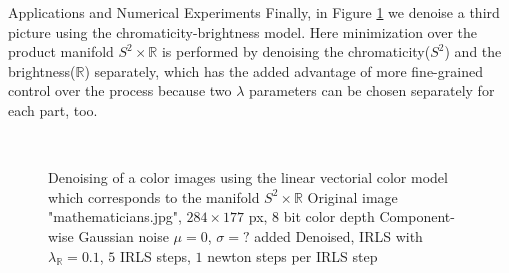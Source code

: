 \begin{chapter}{Applications and Numerical Experiments}
Finally, in Figure \ref{fig:application_color3} we denoise a third picture using the chromaticity-brightness model. Here minimization over the product manifold
$S^2\times \mathbb{R}$ is performed by denoising the chromaticity($S^2$) and the brightness($\mathbb{R}$) separately, which has the added advantage of more 
fine-grained control over the process because two $\lambda$ parameters can be chosen separately for each part, too.

\begin{figure}[h!]
    \centering
    \\
    \caption[Large image "crayons" CBR-vectorial denoising]{Denoising of a color images using the linear vectorial color model which corresponds to the manifold $S^2\times\mathbb{R}$
	 Original image "mathematicians.jpg", $284\times 177$ px, 8 bit color depth
	 Component-wise Gaussian noise $\mu=0$, $\sigma=?$ added
	 Denoised, IRLS with $\lambda_{\mathbb{R}}=0.1$, $5$ IRLS steps, $1$ newton steps per IRLS step
	\label{fig:application_color3}
    }
\end{figure}


\end{chapter}
